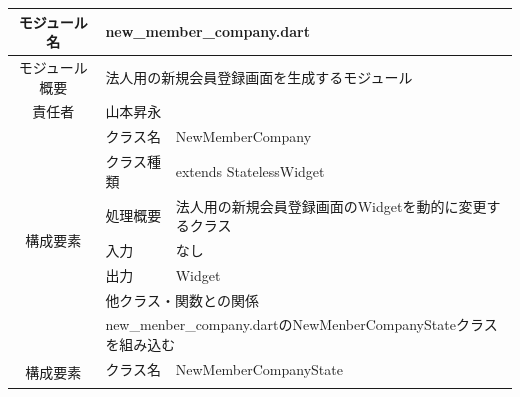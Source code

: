 \begin{table}[H]
  \centering
  \begin{tabular}{|c|l|l|} \hline
    モジュール名                & \multicolumn{2}{l|}{new\_member\_company.dart}                                                                                                 \\ \hline
    モジュール概要               & \multicolumn{2}{p{12cm}|}{法人用の新規会員登録画面を生成するモジュール}                                                                                              \\ \hline
    責任者                   & \multicolumn{2}{l|}{山本昇永}                                                                                                                      \\ \hline
    \multirow{7}{*}{構成要素} & クラス名                                                                               & NewMemberCompany                                          \\ \cline{2-3}
                          & クラス種類                                                                              & extends StatelessWidget                                   \\ \cline{2-3}
                          & 処理概要                                                                               & \multicolumn{1}{p{12cm}|}{法人用の新規会員登録画面のWidgetを動的に変更するクラス} \\ \cline{2-3}
                          & 入力                                                                                 & なし                                                        \\ \cline{2-3}
                          & 出力                                                                                 & Widget                                                    \\ \cline{2-3}
                          & \multicolumn{2}{l|}{他クラス・関数との関係}                                                                                                               \\ \cline{2-3}
                          & \multicolumn{2}{p{14cm}|}{new\_menber\_company.dartのNewMenberCompanyStateクラスを組み込む}                                                             \\ \hline
    \multirow{7}{*}{構成要素} & クラス名                                                                               & NewMemberCompanyState                                     \\ \cline{2-3}

\end{tabular}
\end{table}
